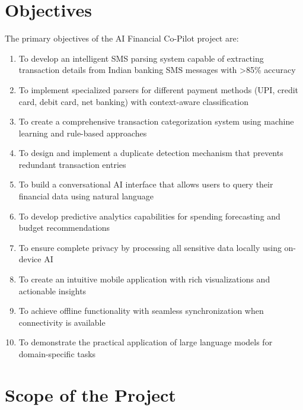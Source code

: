 \documentclass[11pt,a4paper]{report}
\begin{document}
\section{Objectives}

The primary objectives of the AI Financial Co-Pilot project are:

\begin{enumerate}
    \item To develop an intelligent SMS parsing system capable of extracting transaction details from Indian banking SMS messages with >85\% accuracy
    
    \item To implement specialized parsers for different payment methods (UPI, credit card, debit card, net banking) with context-aware classification
    
    \item To create a comprehensive transaction categorization system using machine learning and rule-based approaches
    
    \item To design and implement a duplicate detection mechanism that prevents redundant transaction entries
    
    \item To build a conversational AI interface that allows users to query their financial data using natural language
    
    \item To develop predictive analytics capabilities for spending forecasting and budget recommendations
    
    \item To ensure complete privacy by processing all sensitive data locally using on-device AI
    
    \item To create an intuitive mobile application with rich visualizations and actionable insights
    
    \item To achieve offline functionality with seamless synchronization when connectivity is available
    
    \item To demonstrate the practical application of large language models for domain-specific tasks
\end{enumerate}

\section{Scope of the Project}
\end{document}
